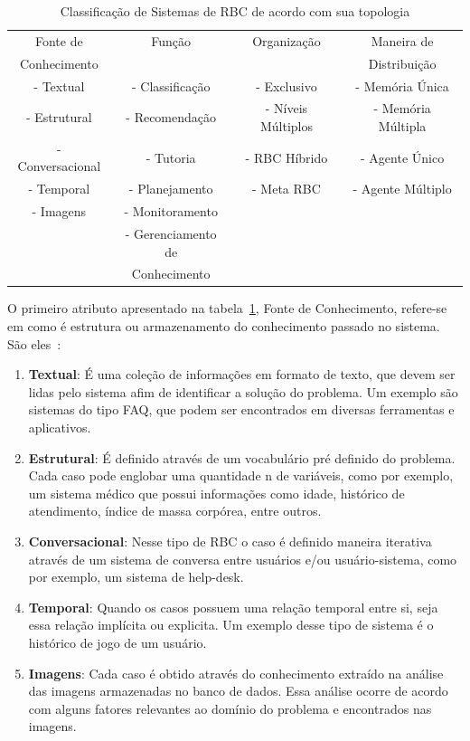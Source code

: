 \begin{table}[h!]
	\centering
	\caption{Classificação de Sistemas de RBC de acordo com sua topologia}
	\begin{tabular}{c | c | c | c} \hline
		Fonte de & Função & Organização & Maneira de \\ 
		Conhecimento & & & Distribuição \\ \hline
		- Textual & - Classificação & - Exclusivo & - Memória Única \\ 
		- Estrutural & - Recomendação & - Níveis Múltiplos & - Memória Múltipla \\
		- Conversacional & - Tutoria & - RBC Híbrido & - Agente Único \\
		- Temporal & - Planejamento & - Meta RBC & - Agente Múltiplo \\
		- Imagens & - Monitoramento & & \\
		& - Gerenciamento de & & \\ 
		& Conhecimento & & \\ \hline
	\end{tabular}
	\label{tab:classificaorbc}
\end{table}

O primeiro atributo apresentado na tabela~\ref{tab:classificaorbc}, Fonte de Conhecimento, refere-se em como é estrutura ou armazenamento do conhecimento passado no sistema. São eles~\cite{Lopez:2013}:

\begin{enumerate}
	\item \textbf{Textual}: É uma coleção de informações em formato de texto, que devem ser lidas pelo sistema afim de identificar a solução do problema. Um exemplo são sistemas do tipo FAQ, que podem ser encontrados em diversas ferramentas e aplicativos.
	\item \textbf{Estrutural}: É definido através de um vocabulário pré definido do problema. Cada caso pode englobar uma quantidade n de variáveis, como por exemplo, um sistema médico que possui informações como idade, histórico de atendimento, índice de massa corpórea, entre outros.
	\item \textbf{Conversacional}: Nesse tipo de RBC o caso é definido maneira iterativa através de um sistema de conversa entre usuários e/ou usuário-sistema, como por exemplo, um sistema de help-desk.
	\item \textbf{Temporal}: Quando os casos possuem uma relação temporal entre si, seja essa relação implícita ou explicita. Um exemplo desse tipo de sistema é o histórico de jogo de um usuário.
	\item \textbf{Imagens}: Cada caso é obtido através do conhecimento extraído na análise das imagens armazenadas no banco de dados. Essa análise ocorre de acordo com alguns fatores relevantes ao domínio do problema e encontrados nas imagens.
\end{enumerate}

